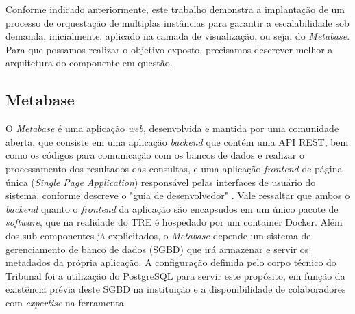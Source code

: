 Conforme indicado anteriormente, este trabalho demonstra a implantação de um processo de orquestação de multiplas instâncias para garantir a escalabilidade sob demanda, inicialmente, aplicado na camada de visualização, ou seja, do \textit{Metabase}. Para que possamos realizar o objetivo exposto, precisamos descrever melhor a arquitetura do componente em questão. 

\subsection{Metabase}

O \textit{Metabase} é uma aplicação \textit{web}, desenvolvida e mantida por uma comunidade aberta, que consiste em uma aplicação \textit{backend} que contém uma API REST, bem como os códigos para comunicação com os bancos de dados e realizar o processamento dos resultados das consultas, e uma aplicação \textit{frontend} de página única (\textit{Single Page Application}) responsável pelas interfaces de usuário do sistema, conforme descreve o "guia de desenvolvedor" \cite{metabaseeevguide}. Vale ressaltar que ambos o \textit{backend} quanto o \textit{frontend} da aplicação são encapsudos em um único pacote de \textit{software}, que na realidade do TRE é hospedado por um container Docker.
Além dos sub componentes já explicitados, o \textit{Metabase} depende um sistema de gerenciamento de banco de dados (SGBD) que irá armazenar e servir os metadados da própria aplicação. A configuração definida pelo corpo técnico do Tribunal foi a utilização do PostgreSQL para servir este propósito, em função da existência prévia deste SGBD na instituição e a disponibilidade de colaboradores com \textit{expertise} na ferramenta.

